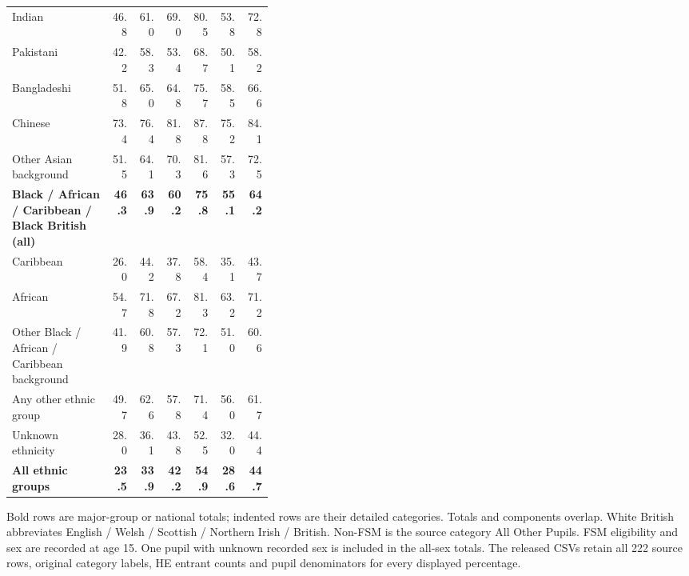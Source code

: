 \begin{table}[htbp]
\begin{tabular}{@{}>{\raggedright\arraybackslash}p{0.38\linewidth}rrrrrr@{}}
\hspace*{0.7em}Indian & 46.8 & 61.0 & 69.0 & 80.5 & 53.8 & 72.8\\
\hspace*{0.7em}Pakistani & 42.2 & 58.3 & 53.4 & 68.7 & 50.1 & 58.2\\
\hspace*{0.7em}Bangladeshi & 51.8 & 65.0 & 64.8 & 75.7 & 58.5 & 66.6\\
\hspace*{0.7em}Chinese & 73.4 & 76.4 & 81.8 & 87.8 & 75.2 & 84.1\\
\hspace*{0.7em}Other Asian background & 51.5 & 64.1 & 70.3 & 81.6 & 57.3 & 72.5\\
\addlinespace[3pt]
\textbf{Black / African / Caribbean / Black British (all)} & \textbf{46.3} & \textbf{63.9} & \textbf{60.2} & \textbf{75.8} & \textbf{55.1} & \textbf{64.2}\\
\hspace*{0.7em}Caribbean & 26.0 & 44.2 & 37.8 & 58.4 & 35.1 & 43.7\\
\hspace*{0.7em}African & 54.7 & 71.8 & 67.2 & 81.3 & 63.2 & 71.2\\
\hspace*{0.7em}Other Black / African / Caribbean background & 41.9 & 60.8 & 57.3 & 72.1 & 51.0 & 60.6\\
Any other ethnic group & 49.7 & 62.6 & 57.8 & 71.4 & 56.0 & 61.7\\
Unknown ethnicity & 28.0 & 36.1 & 43.8 & 52.5 & 32.0 & 44.4\\
\addlinespace[3pt]
\textbf{All ethnic groups} & \textbf{23.5} & \textbf{33.9} & \textbf{42.2} & \textbf{54.9} & \textbf{28.6} & \textbf{44.7}\\
\bottomrule\end{tabular}
\par\medskip
\noindent\footnotesize Bold rows are major-group or national totals; indented rows are their detailed categories. Totals and components overlap. White British abbreviates English / Welsh / Scottish / Northern Irish / British. Non-FSM is the source category All Other Pupils. FSM eligibility and sex are recorded at age 15. One pupil with unknown recorded sex is included in the all-sex totals. The released CSVs retain all 222 source rows, original category labels, HE entrant counts and pupil denominators for every displayed percentage.
\par\endgroup
\end{table}
